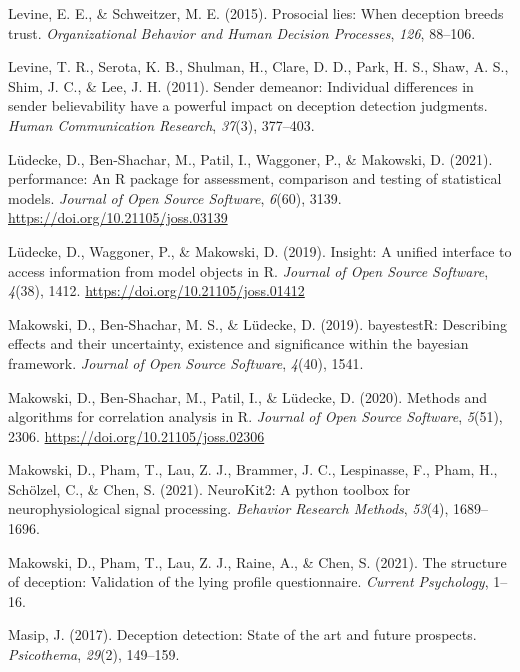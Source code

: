 \documentclass[
  man,mask,floatsintext]{apa6}
\newlength{\cslhangindent}
\newenvironment{CSLReferences}[2] %
 {\begin{list}{}{%
  \setlength{\itemindent}{0pt}
  \setlength{\leftmargin}{0pt}
  \setlength{\parsep}{0pt}
  \ifodd #1
   \setlength{\leftmargin}{\cslhangindent}
   \setlength{\itemindent}{-1\cslhangindent}
  \fi
  \setlength{\itemsep}{#2\baselineskip}}}
 {\end{list}}
\begin{document}
\begin{CSLReferences}{1}{0}
Levine, E. E., \& Schweitzer, M. E. (2015). Prosocial lies: When deception breeds trust. \emph{Organizational Behavior and Human Decision Processes}, \emph{126}, 88--106.

Levine, T. R., Serota, K. B., Shulman, H., Clare, D. D., Park, H. S., Shaw, A. S., Shim, J. C., \& Lee, J. H. (2011). Sender demeanor: Individual differences in sender believability have a powerful impact on deception detection judgments. \emph{Human Communication Research}, \emph{37}(3), 377--403.

Lüdecke, D., Ben-Shachar, M., Patil, I., Waggoner, P., \& Makowski, D. (2021). {performance}: An {R} package for assessment, comparison and testing of statistical models. \emph{Journal of Open Source Software}, \emph{6}(60), 3139. \url{https://doi.org/10.21105/joss.03139}

Lüdecke, D., Waggoner, P., \& Makowski, D. (2019). Insight: A unified interface to access information from model objects in {R}. \emph{Journal of Open Source Software}, \emph{4}(38), 1412. \url{https://doi.org/10.21105/joss.01412}

Makowski, D., Ben-Shachar, M. S., \& Lüdecke, D. (2019). bayestestR: Describing effects and their uncertainty, existence and significance within the bayesian framework. \emph{Journal of Open Source Software}, \emph{4}(40), 1541.

Makowski, D., Ben-Shachar, M., Patil, I., \& Lüdecke, D. (2020). Methods and algorithms for correlation analysis in {R}. \emph{Journal of Open Source Software}, \emph{5}(51), 2306. \url{https://doi.org/10.21105/joss.02306}

Makowski, D., Pham, T., Lau, Z. J., Brammer, J. C., Lespinasse, F., Pham, H., Schölzel, C., \& Chen, S. (2021). NeuroKit2: A python toolbox for neurophysiological signal processing. \emph{Behavior Research Methods}, \emph{53}(4), 1689--1696.

Makowski, D., Pham, T., Lau, Z. J., Raine, A., \& Chen, S. (2021). The structure of deception: Validation of the lying profile questionnaire. \emph{Current Psychology}, 1--16.

Masip, J. (2017). Deception detection: State of the art and future prospects. \emph{Psicothema}, \emph{29}(2), 149--159.


\end{CSLReferences}
\end{document}
